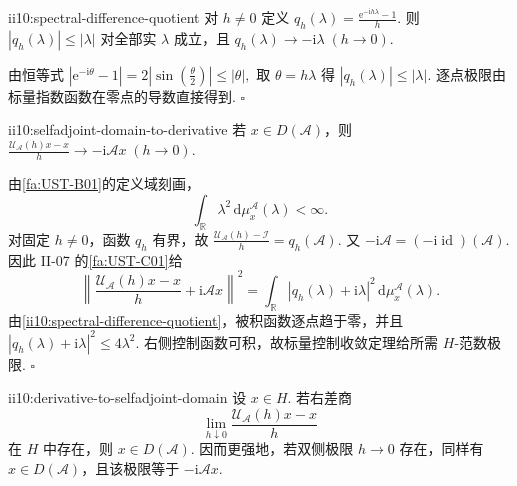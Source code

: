 \begin{FALemma}[C][谱差商的逐点估计]{ii10:spectral-difference-quotient}
对 \(\displaystyle h\neq0\) 定义 \(\displaystyle q_h(\lambda) = \frac{\mathrm{e}^{-\mathrm{i}h\lambda}-1}{h}.\)
则 \(\displaystyle |q_h(\lambda)|\leqslant|\lambda|\)
对全部实 \(\displaystyle\lambda\) 成立，且 \(\displaystyle q_h(\lambda)\longrightarrow-\mathrm{i}\lambda \;(h\to0).\)
\end{FALemma}

\begin{FAProof}
由恒等式 \(\displaystyle |\mathrm{e}^{-\mathrm{i}\theta}-1| = 2|\sin\!\left(\frac{\theta}{2}\right)| \leqslant |\theta|,\)
取 \(\displaystyle\theta=h\lambda\) 得 \(\displaystyle|q_h(\lambda)|\leqslant|\lambda|\). 逐点极限由标量指数函数在零点的导数直接得到.
\hfill\(\square\)
\end{FAProof}

\begin{FAProposition}[B][自伴域上的谱差商极限]{ii10:selfadjoint-domain-to-derivative}
若 \(\displaystyle x\in D(\mathcal A)\)，则 \(\displaystyle \frac{\mathcal U_{\mathcal A}(h)x-x}{h} \longrightarrow -\mathrm{i}\mathcal Ax \;(h\to0).\)
\end{FAProposition}

\begin{FAProof}
由\autoref{fa:UST-B01}的定义域刻画，
\[
\int_{\mathbb R}\lambda^2\,\mathrm{d}\mu_x^{\mathcal A}(\lambda)<\infty.
\]
对固定 \(\displaystyle h\neq0\)，函数 \(\displaystyle q_h\) 有界，故 \(\displaystyle \frac{\mathcal U_{\mathcal A}(h)-\mathcal I}{h} = q_h(\mathcal A).\)
又 \(\displaystyle-\mathrm{i}\mathcal A=(-\mathrm{i}\operatorname{id})(\mathcal A)\). 因此 II-07 的\autoref{fa:UST-C01}给
\[
\left\|
\frac{\mathcal U_{\mathcal A}(h)x-x}{h}
+\mathrm{i}\mathcal Ax
\right\|^2
=
\int_{\mathbb R}
|q_h(\lambda)+\mathrm{i}\lambda|^2
\,\mathrm{d}\mu_x^{\mathcal A}(\lambda).
\]
由\autoref{ii10:spectral-difference-quotient}，被积函数逐点趋于零，并且 \(\displaystyle |q_h(\lambda)+\mathrm{i}\lambda|^2 \leqslant 4\lambda^2.\)
右侧控制函数可积，故标量控制收敛定理给所需 \(\displaystyle H\)-范数极限.
\hfill\(\square\)
\end{FAProof}

\begin{FAProposition}[B][差商极限反推自伴定义域]{ii10:derivative-to-selfadjoint-domain}
设 \(\displaystyle x\in H\). 若右差商
\[
\lim_{h\downarrow0}
\frac{\mathcal U_{\mathcal A}(h)x-x}{h}
\]
在 \(\displaystyle H\) 中存在，则 \(\displaystyle x\in D(\mathcal A)\). 因而更强地，若双侧极限 \(\displaystyle h\to0\) 存在，同样有 \(\displaystyle x\in D(\mathcal A)\)，且该极限等于 \(\displaystyle-\mathrm{i}\mathcal Ax\).
\end{FAProposition}

